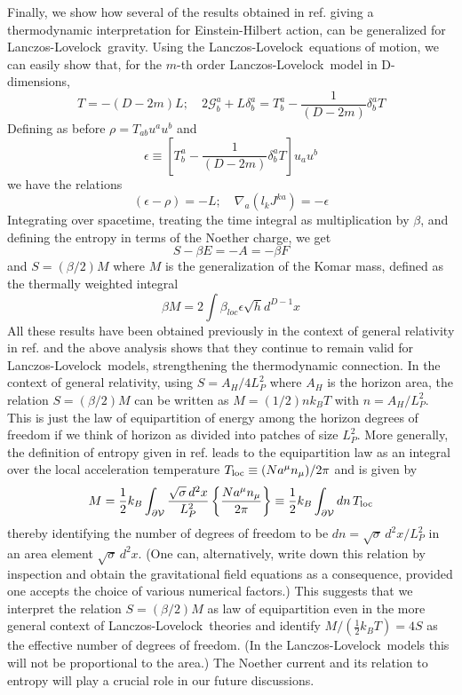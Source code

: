 \documentclass[12pt]{iopart}
\newcommand{\LL}{Lanczos-Lovelock}
\begin{document}
Finally, we show how several of the results obtained in ref.\cite{TPgravcqg04} giving a thermodynamic interpretation for Einstein-Hilbert action, can be generalized for \LL\ gravity. Using the \LL\ equations of motion, we can easily show that, for the $m$-th order \LL\ model in D-dimensions,
\begin{equation}
T=-(D-2m)L;\quad 2\mathcal{G}^a_b+L\delta^a_b=T^a_b-\frac{1}{(D-2m)}\delta^a_bT
\end{equation} 
Defining as before $\rho=T_{ab}u^au^b$ and 
\begin{equation}
\epsilon\equiv[T^a_b-\frac{1}{(D-2m)}\delta^a_bT]u_au^b
\end{equation}
 we have the relations 
\begin{equation}
(\epsilon-\rho)=-L; \quad  \nabla_a(l_kJ^{ka})=-\epsilon
\end{equation}  
Integrating over spacetime, treating the time integral as multiplication by $\beta$, and defining the entropy in terms of the Noether charge, we get
\begin{equation}
S-\beta E=-A=-\beta F
\end{equation}  
and $S=(\beta/2)M$ where $M$ is the generalization of the Komar mass, defined as the thermally weighted integral
\begin{equation}
\beta M=2\int \beta_{loc}\epsilon \sqrt{h}d^{D-1}x
\end{equation} 
All these results have been obtained previously in the context of general relativity in ref.\cite{TPgravcqg04} and the above analysis shows that they continue to remain valid for \LL\ models, strengthening the thermodynamic connection. In the context of general relativity,
using $S=A_H/4L_P^2$ where $A_H$ is the horizon area, the relation $S=(\beta/2)M$ can be written as $M=(1/2)nk_BT$ with $n=A_H/L_P^2$. This is just the law of equipartition of energy among the horizon degrees of freedom \cite{equipartition} if we think of horizon as divided into patches of size $L_P^2$. More generally, the definition of entropy given in  ref.\cite{TPgravcqg04} leads to the equipartition law
as an integral 
over the local acceleration temperature $T_{\rm loc}\equiv (N a^\mu n_\mu) /2\pi$ and is 
given by 
\begin{equation}
M  =  \frac{1}{2}k_B
 \int_{\partial\cal V}\frac{\sqrt{\sigma}\, d^2x}{L_P^2}\left\{\frac{N a^\mu n_\mu}{2\pi}
\right\}
\equiv \frac{1}{2} k_B \int_{\partial\cal V}dn\, T_{\rm loc}
\label{idn}
\end{equation} 
thereby identifying the number of degrees of freedom to be $dn=  \sqrt{\sigma}\, d^2x/L_P^2$ in an area element $\sqrt{\sigma} \, d^2 x$. (One can, alternatively, write down this relation by inspection and obtain the gravitational field equations as a consequence, provided one accepts the choice of various numerical factors.) This suggests that we  interpret the relation $S=(\beta/2)M$ as law of equipartition even in the more general context of \LL\ theories and identify $M/(\frac{1}{2}k_BT)=4S$ as the effective number of degrees of freedom.
(In the \LL\ models this will not be proportional to the area.)
The Noether current and its relation to entropy will play
a crucial role in our future discussions.
\end{document}
